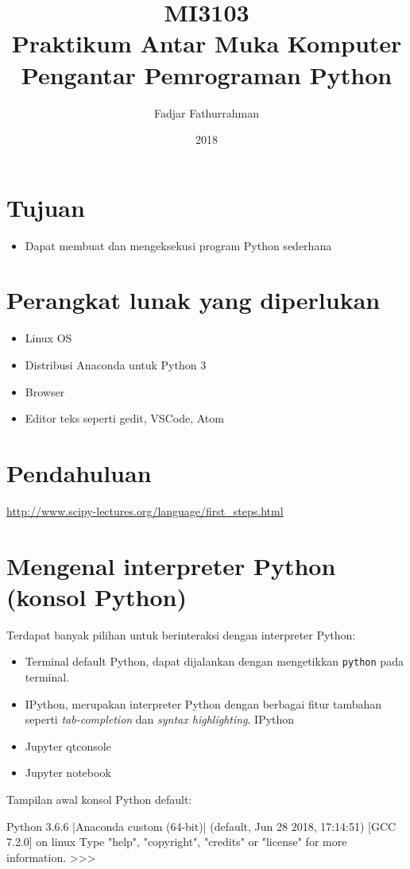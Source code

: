 \documentclass[a4paper,11pt]{extarticle}
\title{
MI3103 \\
Praktikum Antar Muka Komputer\\
Pengantar Pemrograman Python}
\author{Fadjar Fathurrahman}
\date{2018}
\begin{document}
\maketitle

\section{Tujuan}
\begin{itemize}
\item Dapat membuat dan mengeksekusi program Python sederhana
\end{itemize}

\section{Perangkat lunak yang diperlukan}
\begin{itemize}
\item Linux OS
\item Distribusi Anaconda untuk Python 3
\item Browser
\item Editor teks seperti \textsf{gedit}, \textsf{VSCode}, \textsf{Atom}
\end{itemize}

\section{Pendahuluan}

\url{http://www.scipy-lectures.org/language/first_steps.html}

\section{Mengenal interpreter Python (konsol Python)}

Terdapat banyak pilihan untuk berinteraksi dengan interpreter Python:
\begin{itemize}
\item Terminal default Python, dapat dijalankan dengan mengetikkan
\texttt{python} pada terminal.
\item IPython, merupakan interpreter Python dengan berbagai fitur tambahan
seperti \textit{tab-completion} dan \textit{syntax highlighting}.
IPython 
\item Jupyter qtconsole
\item Jupyter notebook
\end{itemize}

Tampilan awal konsol Python default:
\begin{textcode}
Python 3.6.6 |Anaconda custom (64-bit)| (default, Jun 28 2018, 17:14:51) 
[GCC 7.2.0] on linux
Type "help", "copyright", "credits" or "license" for more information.
>>>
\end{textcode}
\end{document}
